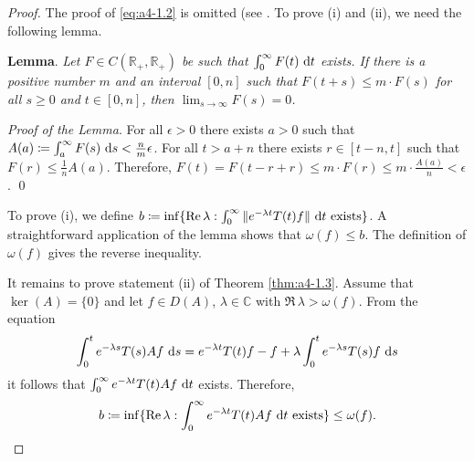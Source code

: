 \begin{proof}  The proof of \eqref{eq:a4-1.2} is omitted (see \citet[p.306]{hillephillips:1957}. 
To prove (i) and (ii), we need the following lemma.



{\bf Lemma}. 
\label{lem:a4-1.3}
{\it Let $F \in C(\mathbb{R}_{+},\mathbb{R}_{+})$ be such that $\int_{0}^{\infty} F(t) \,\mathop{}\!\mathrm{d}{t}$ exists. 
If there is a positive number $m$ and an interval $[0,n]$ such that $F(t + s) \leq m \cdot F(s)$ for all $s \geq 0$ and $t \in [0,n]$, then $\lim_{s \to \infty} F(s) = 0$.}



\textit{Proof of the Lemma}. 
For all $\epsilon > 0$ there exists $a > 0$ such that $A(a) \coloneqq \int_{a}^{\infty} F(s) \,\mathop{}\!\mathrm{d}{s} < \frac{n}{m}\epsilon$.
For all $t > a+n$ there exists $r \in [t-n,t]$ such that $F(r) \leq \frac{1}{n}A(a)$.
Therefore, $F(t) = F(t-r+r) \leq m \cdot F(r) \leq m \cdot \frac{A(a)}{n} < \epsilon$. 
\qed



To prove (i), we define $b \coloneqq \inf\{\mathop{}\!\mathrm{Re}\,\lambda : \int_{0}^{\infty} \|e^{-\lambda t} T(t)f\| \,\mathop{}\!\mathrm{d}{t} \text{ exists}\}$. 
A straightforward application of the lemma shows that $\omega(f) \leq b$.
The definition of $\omega(f)$ gives the reverse inequality.



It remains to prove statement (ii) of Theorem \ref{thm:a4-1.3}.
Assume that $\ker(A) = \{0\}$ and let $f \in D(A)$, $\lambda \in \mathbb{C}$ with $\Re\,\lambda > \omega(f)$. 
From the equation
\[
\int_{0}^{t} e^{-\lambda s} T(s)Af \,\mathop{}\!\mathrm{d}{s} = e^{-\lambda t}T(t)f - f + \lambda \int_{0}^{t} e^{-\lambda s} T(s)f \,\mathop{}\!\mathrm{d}{s}
\]
it follows that $\int_{0}^{\infty} e^{-\lambda t} T(t)Af \,\mathop{}\!\mathrm{d}{t}$ exists. 
Therefore, 
\[b \coloneqq \inf\{\mathop{}\!\mathrm{Re}\,\lambda : \int_{0}^{\infty} e^{-\lambda t}T(t)Af \,\mathop{}\!\mathrm{d}{t} \text{ exists}\} \leq \omega(f).\]




\end{proof}
